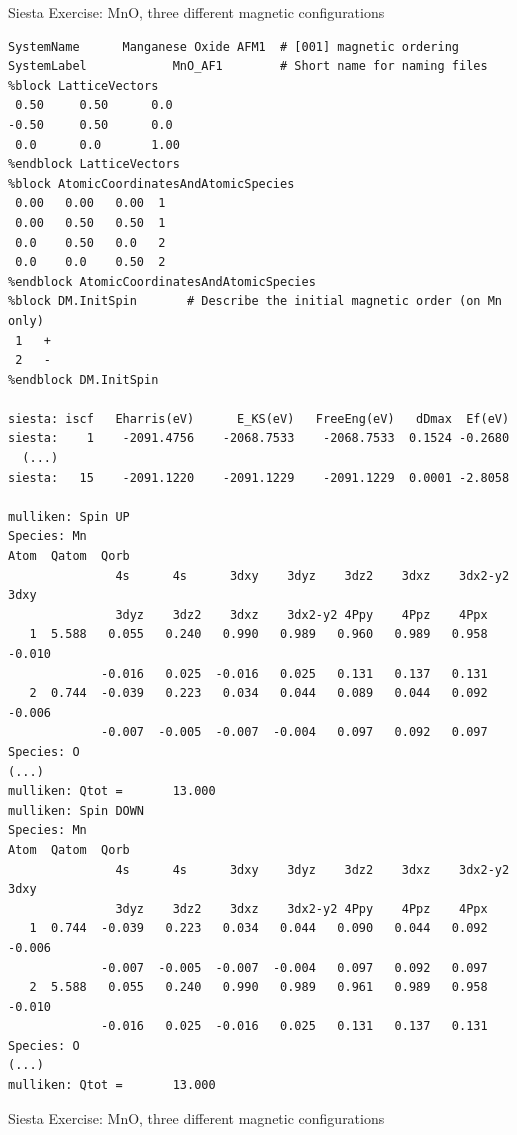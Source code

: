 \documentclass[12pt]{article}
\begin{document}
\centerline{\Large {\sc Siesta} Exercise: 
MnO, three different magnetic configurations}
\bigskip
{\footnotesize
\begin{verbatim}
SystemName      Manganese Oxide AFM1  # [001] magnetic ordering
SystemLabel            MnO_AF1        # Short name for naming files
%block LatticeVectors
 0.50     0.50      0.0
-0.50     0.50      0.0
 0.0      0.0       1.00
%endblock LatticeVectors
%block AtomicCoordinatesAndAtomicSpecies
 0.00   0.00   0.00  1
 0.00   0.50   0.50  1
 0.0    0.50   0.0   2
 0.0    0.0    0.50  2
%endblock AtomicCoordinatesAndAtomicSpecies
%block DM.InitSpin       # Describe the initial magnetic order (on Mn only)
 1   +
 2   -
%endblock DM.InitSpin

siesta: iscf   Eharris(eV)      E_KS(eV)   FreeEng(eV)   dDmax  Ef(eV)
siesta:    1    -2091.4756    -2068.7533    -2068.7533  0.1524 -0.2680
  (...)
siesta:   15    -2091.1220    -2091.1229    -2091.1229  0.0001 -2.8058

mulliken: Spin UP
Species: Mn
Atom  Qatom  Qorb
               4s      4s      3dxy    3dyz    3dz2    3dxz    3dx2-y2 3dxy
               3dyz    3dz2    3dxz    3dx2-y2 4Ppy    4Ppz    4Ppx
   1  5.588   0.055   0.240   0.990   0.989   0.960   0.989   0.958  -0.010
             -0.016   0.025  -0.016   0.025   0.131   0.137   0.131
   2  0.744  -0.039   0.223   0.034   0.044   0.089   0.044   0.092  -0.006
             -0.007  -0.005  -0.007  -0.004   0.097   0.092   0.097
Species: O
(...)
mulliken: Qtot =       13.000
mulliken: Spin DOWN
Species: Mn
Atom  Qatom  Qorb
               4s      4s      3dxy    3dyz    3dz2    3dxz    3dx2-y2 3dxy
               3dyz    3dz2    3dxz    3dx2-y2 4Ppy    4Ppz    4Ppx
   1  0.744  -0.039   0.223   0.034   0.044   0.090   0.044   0.092  -0.006
             -0.007  -0.005  -0.007  -0.004   0.097   0.092   0.097
   2  5.588   0.055   0.240   0.990   0.989   0.961   0.989   0.958  -0.010
             -0.016   0.025  -0.016   0.025   0.131   0.137   0.131
Species: O
(...)
mulliken: Qtot =       13.000
\end{verbatim}
}
\newpage
\centerline{\Large {\sc Siesta} Exercise: 
MnO, three different magnetic configurations}
\bigskip
\end{document}
